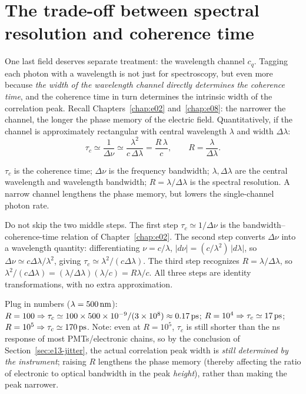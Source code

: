 \section{The trade-off between spectral resolution and coherence time}
\label{sec:e13-spectral}

One last field deserves separate treatment: the wavelength channel $c_q$. Tagging each photon with a wavelength is not just for spectroscopy, but even more because \emph{the width of the wavelength channel directly determines the coherence time}, and the coherence time in turn determines the intrinsic width of the correlation peak. Recall Chapters~\ref{chap:e02} and~\ref{chap:e08}: the narrower the channel, the longer the phase memory of the electric field. Quantitatively, if the channel is approximately rectangular with central wavelength $\lambda$ and width $\Delta\lambda$:
\begin{equation}
  \tau_c
  \simeq
  \frac{1}{\Delta\nu}
  \simeq
  \frac{\lambda^2}{c\,\Delta\lambda}
  =
  \frac{R\,\lambda}{c},
  \qquad
  R=\frac{\lambda}{\Delta\lambda}.
  \label{eq:e13-coherence-time}
\end{equation}
\begin{formulaexplain}
$\tau_c$ is the coherence time; $\Delta\nu$ is the frequency bandwidth; $\lambda,\Delta\lambda$ are the central wavelength and wavelength bandwidth; $R=\lambda/\Delta\lambda$ is the spectral resolution. A narrow channel lengthens the phase memory, but lowers the single-channel photon rate.
\end{formulaexplain}
Do not skip the two middle steps. The first step $\tau_c\simeq1/\Delta\nu$ is the bandwidth--coherence-time relation of Chapter~\ref{chap:e02}. The second step converts $\Delta\nu$ into a wavelength quantity: differentiating $\nu=c/\lambda$, $|d\nu|=(c/\lambda^2)\,|d\lambda|$, so $\Delta\nu\simeq c\Delta\lambda/\lambda^2$, giving $\tau_c\simeq\lambda^2/(c\Delta\lambda)$. The third step recognizes $R=\lambda/\Delta\lambda$, so $\lambda^2/(c\Delta\lambda)=(\lambda/\Delta\lambda)(\lambda/c)=R\lambda/c$. All three steps are identity transformations, with no extra approximation.

Plug in numbers ($\lambda=500\,{\rm nm}$): $R=100\Rightarrow\tau_c\simeq100\times500\times10^{-9}/(3\times10^8)\approx0.17\,{\rm ps}$; $R=10^4\Rightarrow\tau_c\simeq17\,{\rm ps}$; $R=10^5\Rightarrow\tau_c\simeq170\,{\rm ps}$. Note: even at $R=10^5$, $\tau_c$ is still shorter than the ns response of most PMTs/electronic chains, so by the conclusion of Section~\ref{sec:e13-jitter}, the actual correlation peak width is \emph{still determined by the instrument}; raising $R$ lengthens the phase memory (thereby affecting the ratio of electronic to optical bandwidth in the peak \emph{height}), rather than making the peak narrower.

